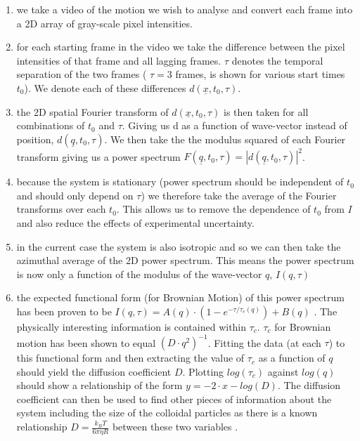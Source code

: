 \documentclass[10pt]{article}
\begin{document}
\begin{enumerate}[label=\alph*]
\item we take a video of the motion we wish to analyse and convert each frame into a 2D array of gray-scale pixel intensities.
\item for each starting frame in the video we take the difference between the pixel intensities of that frame and all lagging frames. $ \tau $ 
denotes the temporal separation of the two frames ( $ \tau = 3 $ frames,  is shown for various start times $ t_0 $). We denote each of these differences $ d(\underline{x}, t_0, \tau) $.
\item the 2D spatial Fourier transform of $ d(\underline{x}, t_0, \tau) $ is then taken for all combinations of $ t_0 $ and $ \tau $. Giving us d as a function of wave-vector instead of position, $ d(\underline{q}, t_0, \tau) $. We then take the the modulus squared of each Fourier transform giving us a power spectrum $F(\underline{q}, t_0, \tau) = |d(\underline{q}, t_0, \tau)|^2$.
\item because the system is stationary (power spectrum should be independent of $t_0$ and should only depend on $\tau$) we therefore take the average of the Fourier transforms over each $t_0$. This allows us to remove the dependence of $t_0$ from $I$ and also reduce the effects of experimental uncertainty.
\item in the current case the system is also isotropic and so we can then take the azimuthal average of the 2D power spectrum. This means the power spectrum is now only a function of the modulus of the wave-vector $q$, $I(q, \tau)$
\item the expected functional form (for Brownian Motion) of this power spectrum has been proven to be $I(q, \tau) = A(q) \cdot (1 - e^{-\tau / \tau_c (q)}) + B(q)$ \cite{DLSPecora}. The physically interesting information is contained within $\tau_c$. $\tau_c$ for Brownian motion has been shown to equal $(D \cdot q^2)^{-1}$. Fitting the data (at each $\tau$) to this functional form and then extracting the value of $\tau_c$ as a function of $q$ should yield the diffusion coefficient $D$. Plotting $log(\tau_c)$ against $log(q)$ should show a relationship of the form $y = -2\cdot x - log(D)$. The diffusion coefficient can then be used to find other pieces of information about the system including the size of the colloidal particles as there is a known relationship $D=\frac{k_B T}{6 \pi \eta R}$ between these two variables \cite{wynot_2002}.
\end{enumerate}
\end{document}
